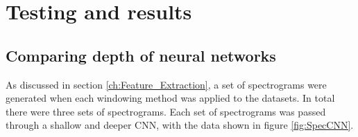 \documentclass[class=report,11pt,crop=false]{standalone}
\begin{document}
\ifstandalone
\tableofcontents
\fi
\section{Testing and results \label{ch:T_R}}







\subsection{Comparing depth of neural networks} \label{ss:networkdepths}

As discussed in section \ref{ch:Feature_Extraction}, a set of spectrograms were generated when each windowing method was applied to the datasets. In total there were three sets of spectrograms. Each set of spectrograms was passed through a shallow and deeper CNN, with the data shown in figure \ref{fig:SpecCNN}.
\end{document}
